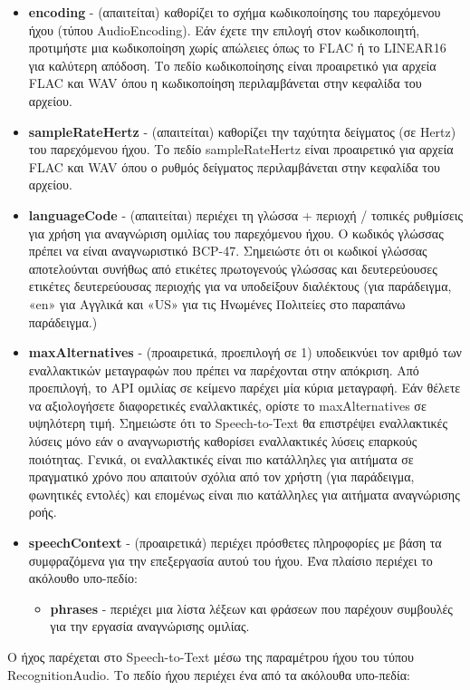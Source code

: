 \documentclass[oneside, 12pt]{book}
\begin{document}
\begin{itemize}
  \item \textbf{encoding} - (απαιτείται) καθορίζει το σχήμα κωδικοποίησης του παρεχόμενου ήχου (τύπου AudioEncoding). Εάν έχετε την επιλογή στον κωδικοποιητή, προτιμήστε μια κωδικοποίηση χωρίς απώλειες όπως το FLAC ή το LINEAR16 για καλύτερη απόδοση. Το πεδίο κωδικοποίησης είναι προαιρετικό για αρχεία FLAC και WAV όπου η κωδικοποίηση περιλαμβάνεται στην κεφαλίδα του αρχείου.
  \item \textbf{sampleRateHertz} - (απαιτείται) καθορίζει την ταχύτητα δείγματος (σε Hertz) του παρεχόμενου ήχου. Το πεδίο sampleRateHertz είναι προαιρετικό για αρχεία FLAC και WAV όπου ο ρυθμός δείγματος περιλαμβάνεται στην κεφαλίδα του αρχείου.
  \item \textbf{languageCode} - (απαιτείται) περιέχει τη γλώσσα + περιοχή / τοπικές ρυθμίσεις για χρήση για αναγνώριση ομιλίας του παρεχόμενου ήχου. Ο κωδικός γλώσσας πρέπει να είναι αναγνωριστικό BCP-47. Σημειώστε ότι οι κωδικοί γλώσσας αποτελούνται συνήθως από ετικέτες πρωτογενούς γλώσσας και δευτερεύουσες ετικέτες δευτερεύουσας περιοχής για να υποδείξουν διαλέκτους (για παράδειγμα, «en» για Αγγλικά και «US» για τις Ηνωμένες Πολιτείες στο παραπάνω παράδειγμα.)
  \item \textbf{maxAlternatives} - (προαιρετικά, προεπιλογή σε 1) υποδεικνύει τον αριθμό των εναλλακτικών μεταγραφών που πρέπει να παρέχονται στην απόκριση. Από προεπιλογή, το API ομιλίας σε κείμενο παρέχει μία κύρια μεταγραφή. Εάν θέλετε να αξιολογήσετε διαφορετικές εναλλακτικές, ορίστε το maxAlternatives σε υψηλότερη τιμή. Σημειώστε ότι το Speech-to-Text θα επιστρέψει εναλλακτικές λύσεις μόνο εάν ο αναγνωριστής καθορίσει εναλλακτικές λύσεις επαρκούς ποιότητας. Γενικά, οι εναλλακτικές είναι πιο κατάλληλες για αιτήματα σε πραγματικό χρόνο που απαιτούν σχόλια από τον χρήστη (για παράδειγμα, φωνητικές εντολές) και επομένως είναι πιο κατάλληλες για αιτήματα αναγνώρισης ροής.
  \item \textbf{speechContext} - (προαιρετικά) περιέχει πρόσθετες πληροφορίες με βάση τα συμφραζόμενα για την επεξεργασία αυτού του ήχου. Ένα πλαίσιο περιέχει το ακόλουθο υπο-πεδίο:
  \begin{itemize}
    \item \textbf{phrases} - περιέχει μια λίστα λέξεων και φράσεων που παρέχουν συμβουλές για την εργασία αναγνώρισης ομιλίας.
  \end{itemize}
\end{itemize}
Ο ήχος παρέχεται στο Speech-to-Text μέσω της παραμέτρου ήχου του τύπου RecognitionAudio. Το πεδίο ήχου περιέχει ένα από τα ακόλουθα υπο-πεδία:
\end{document}
